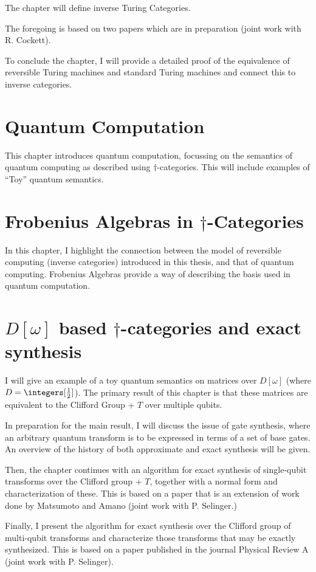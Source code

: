 The chapter will define inverse Turing Categories.

The foregoing is based on two papers which are in preparation (joint work with R. Cockett).

To conclude the chapter, I will provide a detailed proof of the equivalence of reversible Turing
machines and standard Turing machines and connect this to inverse categories.

\section*{Quantum Computation}
This chapter introduces quantum computation, focussing on the semantics of quantum computing as
described using $\dagger$-categories. This will include examples of ``Toy'' quantum semantics.

\section*{Frobenius Algebras in $\dagger$-Categories}

In this chapter, I highlight the connection between the model of reversible computing (inverse
categories) introduced in this thesis, and that of quantum computing. Frobenius Algebras provide a
way of describing the basis used in quantum computation.


\section*{$D[\omega]$ based $\dagger$-categories and exact synthesis}

I will give an example of a toy quantum semantics on matrices over $D[\omega]$ (where
$D = \integers[\frac{1}{2}]$). The primary result of this chapter is that these matrices are
equivalent to the Clifford Group + $T$ over multiple qubits.

In preparation for the main result, I will discuss the issue of gate synthesis, where an arbitrary
quantum transform is to be expressed in terms of a set of base gates. An overview of the history of
both approximate and exact synthesis will be given.

Then, the chapter continues with an algorithm for exact synthesis of single-qubit transforms over
the Clifford group + $T$, together with a normal form and characterization of these. This is based
on a paper that is an extension of work done by Matsumoto and Amano (joint work with P. Selinger.)

Finally, I present the algorithm for exact synthesis over the Clifford group of multi-qubit
transforms and characterize those transforms that may be exactly synthesized. This is based on a
paper published in the journal Physical Review A (joint work with P. Selinger).

